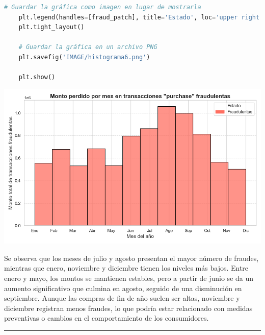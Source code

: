 \documentclass{article}
\begin{document}
\begin{itemize}
\begin{lstlisting}[language=Python, caption= Implementación histograma del monto perdido por mes por transaccines de tipo purchase con estado fraudolenta.]
    # Guardar la gráfica como imagen en lugar de mostrarla
    plt.legend(handles=[fraud_patch], title='Estado', loc='upper right', fontsize=12)
    plt.tight_layout()
    
    # Guardar la gráfica en un archivo PNG
    plt.savefig('IMAGE/histograma6.png')
    
    plt.show()
\end{lstlisting}

 \begin{center}
    \includegraphics[scale = .3]{IMAGE/histograma6.png}
\end{center}

Se observa que los meses de julio y agosto presentan el mayor número de fraudes, mientras que enero, noviembre y diciembre tienen los niveles más bajos. 
Entre enero y mayo, los montos se mantienen estables, pero a partir de junio se da un aumento significativo que culmina en agosto, seguido de una disminución en septiembre. 
Aunque las compras de fin de año suelen ser altas, noviembre y diciembre registran menos fraudes, lo que podría estar relacionado con medidas preventivas o cambios en el comportamiento de los consumidores.

    
\end{itemize}

{\color{black}\rule{\textwidth}{1.5pt}}
\end{document}

